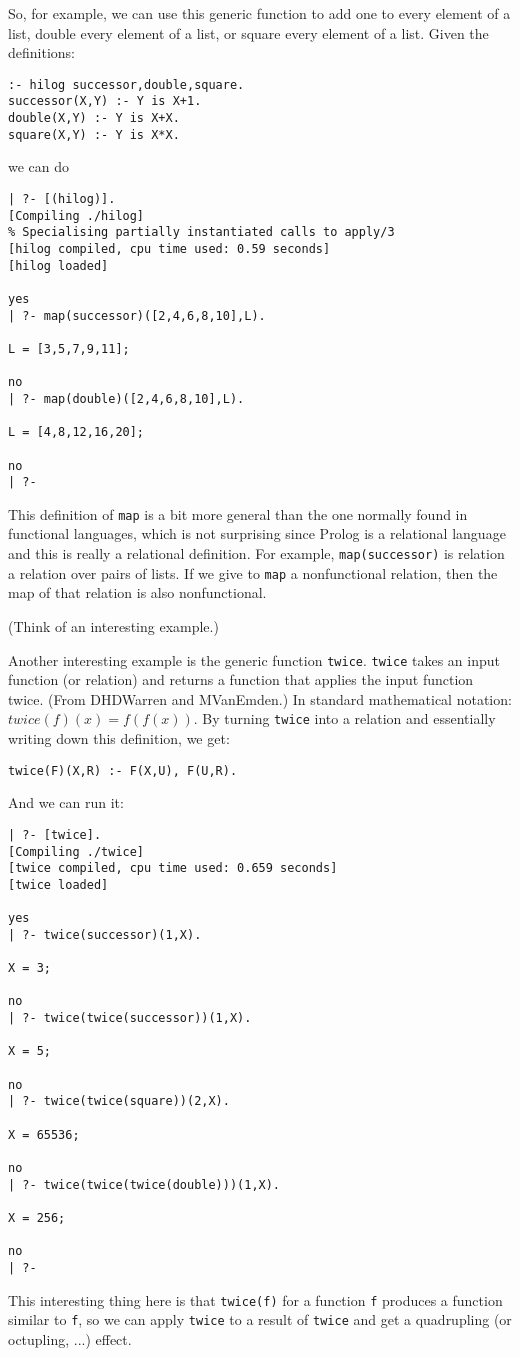 So, for example, we can use this generic function to add one to every
element of a list, double every element of a list, or square every
element of a list. Given the definitions:
\begin{verbatim}
:- hilog successor,double,square.
successor(X,Y) :- Y is X+1.
double(X,Y) :- Y is X+X.
square(X,Y) :- Y is X*X.
\end{verbatim}
we can do
\begin{verbatim}
| ?- [(hilog)].
[Compiling ./hilog]
% Specialising partially instantiated calls to apply/3
[hilog compiled, cpu time used: 0.59 seconds]
[hilog loaded]

yes
| ?- map(successor)([2,4,6,8,10],L).

L = [3,5,7,9,11];

no
| ?- map(double)([2,4,6,8,10],L).

L = [4,8,12,16,20];

no
| ?- 
\end{verbatim}

This definition of \verb|map| is a bit more general than the one
normally found in functional languages, which is not surprising since
Prolog is a relational language and this is really a relational
definition.  For example, \verb|map(successor)| is relation a relation
over pairs of lists.  If we give to \verb|map| a nonfunctional
relation, then the map of that relation is also nonfunctional.

(Think of an interesting example.)


Another interesting example is the generic function \verb|twice|.
\verb|twice| takes an input function (or relation) and returns a
function that applies the input function twice.  (From DHDWarren and
MVanEmden.)  In standard mathematical notation: $twice(f)(x) =
f(f(x))$.  By turning \verb|twice| into a relation and essentially
writing down this definition, we get:
\begin{verbatim}
twice(F)(X,R) :- F(X,U), F(U,R).
\end{verbatim}
And we can run it:
\begin{verbatim}
| ?- [twice].
[Compiling ./twice]
[twice compiled, cpu time used: 0.659 seconds]
[twice loaded]

yes
| ?- twice(successor)(1,X).

X = 3;

no
| ?- twice(twice(successor))(1,X).

X = 5;

no
| ?- twice(twice(square))(2,X).

X = 65536;

no
| ?- twice(twice(twice(double)))(1,X).

X = 256;

no
| ?- 
\end{verbatim}
This interesting thing here is that \verb|twice(f)| for a function
\verb|f| produces a function similar to \verb|f|, so we can apply
\verb|twice| to a result of \verb|twice| and get a quadrupling (or
octupling, ...)  effect.

